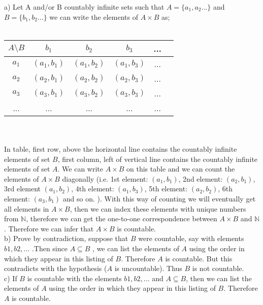\documentclass[12pt]{article}
\begin{document}
\hspace{6mm}a)	
Let A and/or B countably infinite sets such that $A=\{a_1,a_2...\}$ and
$B=\{b_1,b_2...\}$ we can write the elements of $A\times B$ as;\\\\
\begin{tabular}{ c| c c c c c}
 $A \setminus B$  &$ b_1$ & $b_2$ & $b_3$ & ...  \\
   \hline
 $ a_1$ & $(a_1,b_1)$ & $(a_1,b_2)$ & $(a_1,b_3)$ &...\\
 $ a_2$ & $(a_2,b_1)$ & $(a_2,b_2)$ & $(a_2,b_3)$ &...\\
 $ a_3$ & $(a_3,b_1)$ & $(a_3,b_2)$ & $(a_3,b_3)$ &...\\
 ... & ... & ... & ... & ...
\end{tabular}
\\\\
In table, first row, above the horizontal line contains the countably infinite elements of set $B$, first column, left of vertical line contains the countably infinite elements of set $A$. We can write $A \times B$ on this table and we can count the elements of $A \times B$ diagonally (i.e. 1st element: $(a_1,b_1)$, 2nd element: $(a_2,b_1)$, 3rd element $(a_1,b_2)$, 4th element: $(a_1,b_3)$, 5th element: $(a_2,b_2)$, 6th element: $(a_3,b_1)$ and so on. ). With this way of counting we will eventually get all elements in $A \times B$, then we can index these elements with unique numbers from $\mathbb{N}$, therefore we can get the one-to-one correspondence between $A \times B$ and  $\mathbb{N}$. Therefore we can infer that $A \times B$ is countable.\\

b)	Prove by contradiction, suppose that $B$ were countable, say with elements $b1, b2 , ...$ .Then since $A \subseteq B$ , we can list the elements of $A$ using the order in which they appear in this listing of $B$. Therefore $A$ is countable. But this contradicts with the hypothesis ($A$ is uncountable). Thus $B$ is not countable.\\

c)	If $B$ is countable with the elements $b1, b2 , ...$ and $A \subseteq B$, then we can list the elements of $A$ using the order in which they appear in this listing of $B$. Therefore $A$ is countable.

\newpage
\end{document}
